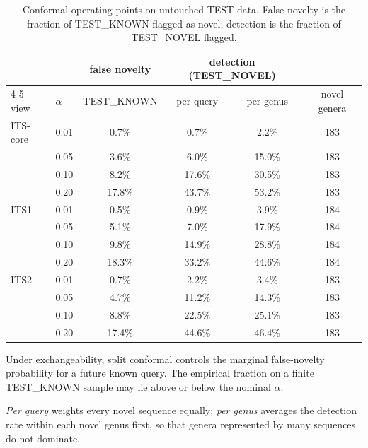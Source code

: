 \begin{table}[htbp]\centering
\begin{threeparttable}
\caption{Conformal operating points on untouched TEST data. False novelty is the fraction of TEST\_KNOWN flagged as novel; detection is the fraction of TEST\_NOVEL flagged.}
\label{tab:conformal}
\small
\begin{tabular}{llcccc}
\toprule
 & & false novelty & \multicolumn{2}{c}{detection (TEST\_NOVEL)} & \\
\cmidrule(lr){4-5}
view & $\alpha$ & TEST\_KNOWN & per query & per genus & novel genera \\
\midrule
ITS-core & 0.01 & 0.7\% & 0.7\% & 2.2\% & 183 \\
 & 0.05 & 3.6\% & 6.0\% & 15.0\% & 183 \\
 & 0.10 & 8.2\% & 17.6\% & 30.5\% & 183 \\
 & 0.20 & 17.8\% & 43.7\% & 53.2\% & 183 \\
\addlinespace
ITS1 & 0.01 & 0.5\% & 0.9\% & 3.9\% & 184 \\
 & 0.05 & 5.1\% & 7.0\% & 17.9\% & 184 \\
 & 0.10 & 9.8\% & 14.9\% & 28.8\% & 184 \\
 & 0.20 & 18.3\% & 33.2\% & 44.6\% & 184 \\
\addlinespace
ITS2 & 0.01 & 0.7\% & 2.2\% & 3.4\% & 183 \\
 & 0.05 & 4.7\% & 11.2\% & 14.3\% & 183 \\
 & 0.10 & 8.8\% & 22.5\% & 25.1\% & 183 \\
 & 0.20 & 17.4\% & 44.6\% & 46.4\% & 183 \\
\bottomrule
\end{tabular}
\begin{tablenotes}\footnotesize
\item Under exchangeability, split conformal controls the marginal false-novelty probability for a future known query. The empirical fraction on a finite TEST\_KNOWN sample may lie above or below the nominal $\alpha$.
\item \emph{Per query} weights every novel sequence equally; \emph{per genus} averages the detection rate within each novel genus first, so that genera represented by many sequences do not dominate.
\end{tablenotes}
\end{threeparttable}
\end{table}
